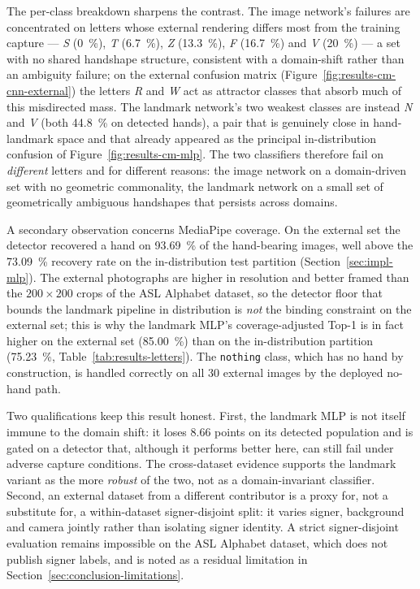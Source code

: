 The per-class breakdown sharpens the contrast. The image network's
failures are concentrated on letters whose external rendering differs
most from the training capture --- \textit{S} (\SI{0}{\percent}),
\textit{T} (\SI{6.7}{\percent}), \textit{Z} (\SI{13.3}{\percent}),
\textit{F} (\SI{16.7}{\percent}) and \textit{V} (\SI{20}{\percent})
--- a set with no shared handshape structure, consistent with a
domain-shift rather than an ambiguity failure; on the external
confusion matrix (Figure~\ref{fig:results-cm-cnn-external}) the
letters \textit{R} and \textit{W} act as attractor classes that
absorb much of this misdirected mass. The landmark network's
two weakest classes are instead \textit{N} and \textit{V}
(both \SI{44.8}{\percent} on detected hands), a pair that is
genuinely close in hand-landmark space and that already appeared as
the principal in-distribution confusion of
Figure~\ref{fig:results-cm-mlp}. The two classifiers therefore fail on
\emph{different} letters and for different reasons: the image network
on a domain-driven set with no geometric commonality, the landmark
network on a small set of geometrically ambiguous handshapes that
persists across domains.

A secondary observation concerns MediaPipe coverage. On the external
set the detector recovered a hand on \SI{93.69}{\percent} of the
hand-bearing images, well above the \SI{73.09}{\percent} recovery rate
on the in-distribution test partition
(Section~\ref{sec:impl-mlp}). The external photographs are higher in
resolution and better framed than the \(200\times200\) crops of the
ASL Alphabet dataset, so the detector floor that bounds the landmark
pipeline in distribution is \emph{not} the binding constraint on the
external set; this is why the landmark MLP's coverage-adjusted Top-1
is in fact higher on the external set
(\SI{85.00}{\percent}) than on the in-distribution partition
(\SI{75.23}{\percent}, Table~\ref{tab:results-letters}). The
\texttt{nothing} class, which has no hand by construction, is handled
correctly on all \num{30} external images by the deployed
no-hand path.

Two qualifications keep this result honest. First, the landmark MLP is
not itself immune to the domain shift: it loses \SI{8.66}{} points on
its detected population and is gated on a detector that, although it
performs better here, can still fail under adverse capture conditions.
The cross-dataset evidence supports the landmark variant as the more
\emph{robust} of the two, not as a domain-invariant classifier.
Second, an external dataset from a different contributor is a proxy
for, not a substitute for, a within-dataset signer-disjoint split:
it varies signer, background and camera jointly rather than isolating
signer identity. A strict signer-disjoint evaluation remains
impossible on the ASL Alphabet dataset, which does not publish signer
labels, and is noted as a residual limitation in
Section~\ref{sec:conclusion-limitations}.


